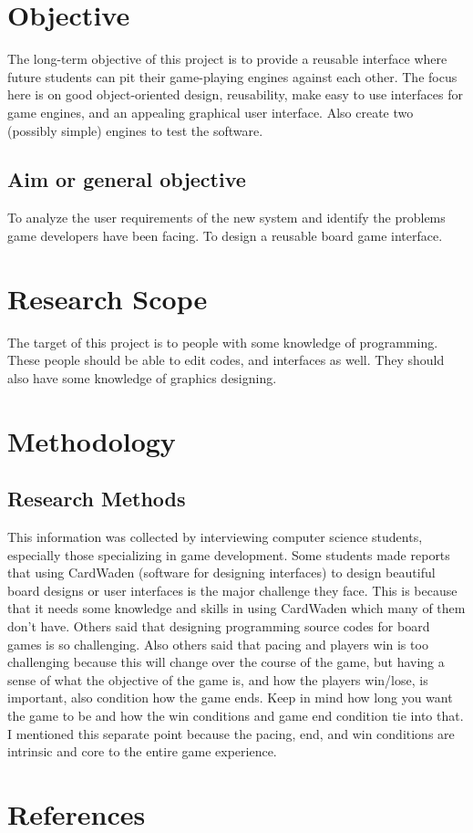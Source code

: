 \documentclass[a4paper,12pt]{article}
\begin{document}
\section{	Objective}
The long-term objective of this project is to provide a reusable interface where future students can pit their game-playing engines against each other. The focus here is on good object-oriented design, reusability, make easy to use interfaces for game engines, and an appealing graphical user interface. Also create two (possibly simple) engines to test the software.


\subsection{Aim or general objective}
To analyze the user requirements of the new system and identify the problems game developers have been facing. 
To design a reusable board game interface. 
\section{Research Scope}
The target of this project is to people with some knowledge of programming. 
These people should be able to edit codes, and interfaces as well. 
They should also have some knowledge of graphics designing.
	
\section{Methodology}
\subsection{Research Methods}
This information was collected by interviewing computer science students, especially those specializing in game development. Some students made reports that using CardWaden (software for designing interfaces) to design beautiful board designs or user interfaces is the major challenge they face. This is because that it needs some knowledge and skills in using CardWaden which many of them don’t have. Others said that designing programming source codes for board games is so challenging.  Also others said that pacing and players win is too challenging because this will change over the course of the game, but having a sense of what the objective of the game is, and how the players win/lose, is important, also condition how the game ends. Keep in mind how long you want the game to be and how the win conditions and game end condition tie into that. I mentioned this separate point because the pacing, end, and win conditions are intrinsic and core to the entire game experience.
\section{References}{

}
\end{document}
